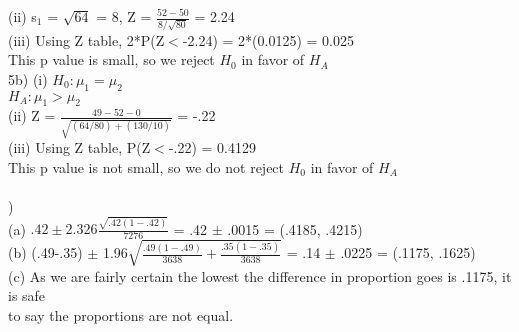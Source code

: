 \documentclass[12pt]{article}
\begin{document}
\indent (ii) s$_1$ = $\sqrt{64}$ = 8, Z = {\Large $\frac{52 - 50}{8/\sqrt{80}}$} = 2.24\\

\indent (iii) Using Z table, 2*P(Z$<$-2.24) = 2*(0.0125) = 0.025\\
\indent \indent This p value is small, so we reject $H_0$ in favor of $H_A$\\


\noindent 5b)
\indent (i) $H_0 : \mu_1 = \mu_2$\\
\indent \indent $H_A : \mu_1 > \mu_2$\\

\indent (ii) Z = {\Large $\frac{49 - 52 - 0}{\sqrt{ (64/80) + (130/10) }}$} = -.22\\

\indent (iii) Using Z table, P(Z$<$-.22) = 0.4129\\
\indent \indent This p value is not small, so we do not reject $H_0$ in favor of $H_A$\\


\noindent \hrulefill \\


)\\
\indent (a) $.42 \pm 2.326${\Large $\frac{\sqrt{.42(1-.42)}}{7276}$} = .42 $\pm$ .0015 = (.4185, .4215)\\

\indent (b) (.49-.35) $\pm$ 1.96{\Large $\sqrt{\frac{.49(1-.49)}{3638} + \frac{.35(1-.35)}{3638}}$} = .14 $\pm$ .0225 = (.1175, .1625)\\

\indent (c) As we are fairly certain the lowest the difference in proportion goes is .1175, it is safe \\
\indent \indent to say the proportions are not equal.
\end{document}
